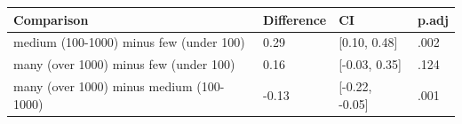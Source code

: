 \begin{table}[ht]
\centering
\begingroup\footnotesize
\begin{tabular}{llll}
  \toprule
Comparison & Difference & CI & p.adj \\ 
  \midrule
medium (100-1000) minus few (under 100) & 0.29 & [0.10, 0.48] & .002 \\ 
  many (over 1000) minus few (under 100) & 0.16 & [-0.03, 0.35] & .124 \\ 
  many (over 1000) minus medium (100-1000) & -0.13 & [-0.22, -0.05] & .001 \\ 
   \bottomrule
\end{tabular}
\endgroup
\end{table}

